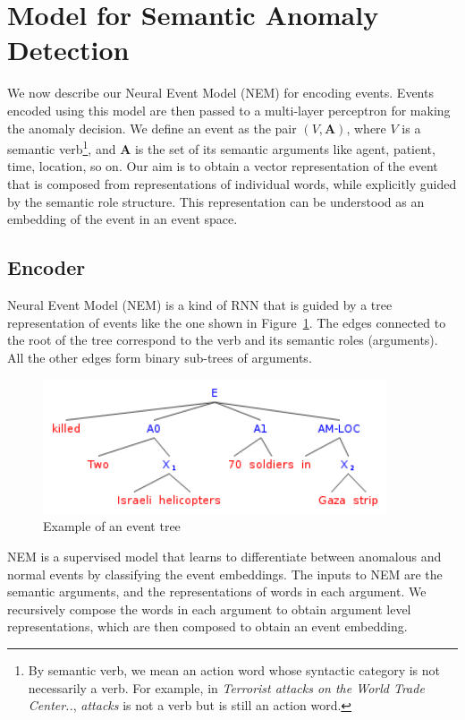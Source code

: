 \section{Model for Semantic Anomaly Detection}
We now describe our Neural Event Model (NEM) for encoding events. Events encoded using this model are then passed to a multi-layer perceptron
for making the anomaly decision. We define an event as the pair $(V, \textbf{A})$, where $V$
is a semantic verb\footnote{By semantic verb, we mean an action word whose
syntactic category is not necessarily a verb.  
For example, in \textit{Terrorist attacks on the World Trade Center..},
\textit{attacks} is not a verb but is still an 
action word.}, and $\textbf{A}$ is the set of its semantic arguments like agent,
patient, time, location, so on. Our aim
is to obtain a vector representation of the event that is composed from
representations of individual words, while explicitly guided by the semantic
role structure.
This representation can be understood as an embedding of the
event
in an event space.  

\subsection{Encoder}
Neural Event Model (NEM) is a kind of RNN
that is guided by a tree representation of events like the one shown in
Figure~\ref{fig:nem_event_tree}.  The edges 
connected to the root of the tree correspond to the verb and its semantic roles
(arguments).  All the other edges form binary sub-trees of arguments.  
\begin{figure}
  \begin{center}
  \includegraphics[width=4in]{figures/event_tree.png}
  \caption{Example of an event tree}
  \label{fig:nem_event_tree}
  \end{center}
 \end{figure}
NEM is a supervised model that learns to differentiate between anomalous and
normal events by 
classifying the event embeddings.  
The inputs to NEM are the semantic arguments, and the representations of words
in 
each argument.  We recursively compose the words in each argument to obtain
argument level
representations, which are then composed to obtain an event embedding. 

